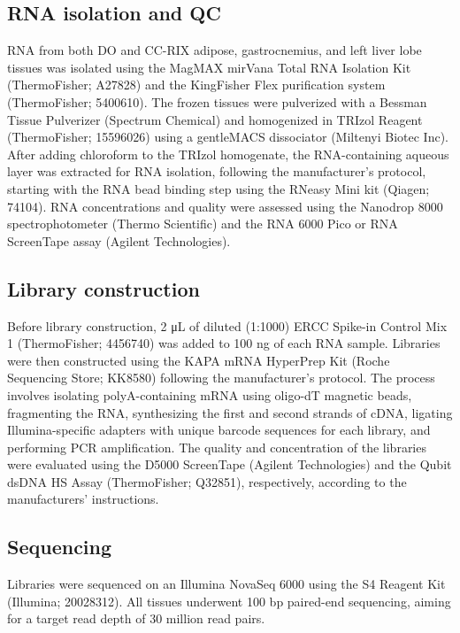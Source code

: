 \documentclass[
]{article}
\begin{document}
\subsection{RNA isolation and QC}\label{rna-isolation-and-qc}

RNA from both DO and CC-RIX adipose, gastrocnemius, and left liver lobe
tissues was isolated using the MagMAX mirVana Total RNA Isolation Kit
(ThermoFisher; A27828) and the KingFisher Flex purification system
(ThermoFisher; 5400610). The frozen tissues were pulverized with a
Bessman Tissue Pulverizer (Spectrum Chemical) and homogenized in
TRIzol\textsuperscript{\texttrademark} Reagent (ThermoFisher; 15596026)
using a gentleMACS dissociator (Miltenyi Biotec Inc). After adding
chloroform to the TRIzol homogenate, the RNA-containing aqueous layer
was extracted for RNA isolation, following the manufacturer's protocol,
starting with the RNA bead binding step using the RNeasy Mini kit
(Qiagen; 74104). RNA concentrations and quality were assessed using the
Nanodrop 8000 spectrophotometer (Thermo Scientific) and the RNA 6000
Pico or RNA ScreenTape assay (Agilent Technologies).

\subsection{Library construction}\label{library-construction}

Before library construction, 2 \si{\micro\liter} of diluted (1:1000)
ERCC Spike-in Control Mix 1 (ThermoFisher; 4456740) was added to 100 ng
of each RNA sample. Libraries were then constructed using the KAPA mRNA
HyperPrep Kit (Roche Sequencing Store; KK8580) following the
manufacturer's protocol. The process involves isolating polyA-containing
mRNA using oligo-dT magnetic beads, fragmenting the RNA, synthesizing
the first and second strands of cDNA, ligating Illumina-specific
adapters with unique barcode sequences for each library, and performing
PCR amplification. The quality and concentration of the libraries were
evaluated using the D5000 ScreenTape (Agilent Technologies) and the
Qubit dsDNA HS Assay (ThermoFisher; Q32851), respectively, according to
the manufacturers' instructions.

\subsection{Sequencing}\label{sequencing}

Libraries were sequenced on an Illumina NovaSeq 6000 using the S4
Reagent Kit (Illumina; 20028312). All tissues underwent 100 bp
paired-end sequencing, aiming for a target read depth of 30 million read
pairs.
\end{document}
